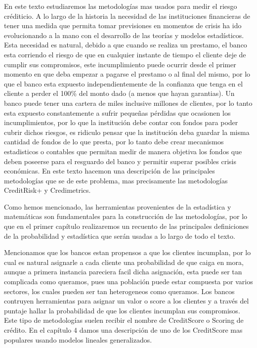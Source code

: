 \documentclass[
  12pt,
]{krantz}
\theoremstyle{definition}
\theoremstyle{definition}
\theoremstyle{definition}
\theoremstyle{remark}
\begin{document}
En este texto estudiaremos las metodologías mas usados para medir el riesgo créditicio. A lo largo de la historia la necesidad de las instituciones financieras de tener una medida que permita tomar previsiones en momentos de crisis ha ido evolucionando a la mano con el desarrollo de las teorías y modelos estadísticos. Esta necesidad es natural, debido a que cuando se realiza un prestamo, el banco esta corriendo el riesgo de que en cualquier instante de tiempo el cliente deje de cumplir sus compromisos, este incumplimiento puede ocurrir desde el primer momento en que deba empezar a pagarse el prestamo o al final del mismo, por lo que el banco esta expuesto independientemente de la confianza que tenga en el cliente a perder el 100\% del monto dado (a menos que hayan garantias). Un banco puede tener una cartera de miles inclusive millones de clientes, por lo tanto esta expuesto constantemente a sufrir pequeñas pérdidas que ocasionen los incumplimientos, por lo que la institución debe contar con fondos para poder cubrir dichos riesgos, es ridiculo pensar que la institución deba guardar la misma cantidad de fondos de lo que presta, por lo tanto debe crear mecanismos estadisticos o contables que permitan medir de manera objetiva los fondos que deben poseerse para el resguardo del banco y permitir superar posibles crisis económicas. En este texto hacemon una descripción de las principales metodologías que se de este problema, mas precisamente las metodologías CreditRisk+ y Credimetrics.

Como hemos mencionado, las herramientas provenientes de la estadística y matemáticas son fundamentales para la construcción de las metodologías, por lo que en el primer capítulo realizaremos un recuento de las principales definiciones de la probabilidad y estadística que serán usadas a lo largo de todo el texto.

Mencionamos que los bancos estan propensos a que los clientes incumplan, por lo cual es natural asignarle a cada cliente una probabilidad de que caiga en mora, aunque a primera instancia pareciera facil dicha asignación, esta puede ser tan complicada como queramos, pues una población puede estar compuesta por varios sectores, los cuales pueden ser tan heterogeneos como queramos. Los bancos contruyen herramientas para asignar un valor o score a los clientes y a través del puntaje hallar la probabilidad de que los clientes incumplan sus compromisos. Este tipo de metodologías suelen recibir el nombre de CreditScore o Scoring de crédito. En el capítulo 4 damos una descripción de uno de los CreditScore mas populares usando modelos lineales generalizados.
\end{document}
